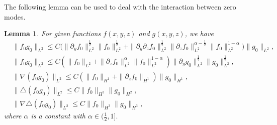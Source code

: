 \documentclass[12pt, reqno]{amsart}
\newtheorem{lemma}{Lemma}[section]
\numberwithin{equation}{section}
\begin{document}
	The following lemma can be used to deal with the interaction between zero modes.
	\begin{lemma}\label{sob_12}
		For  given functions $f(x,y,z)$ and $g(x,y,z)$, we have
		\begin{equation}\label{sob_result_4}
			\begin{aligned}
				&\|f_{0}g_{0}\|_{L^{2}}
				\leq C\big(\|\partial_yf_{0}\|^{\frac{1}{2}}_{L^2}\|f_{0}\|^{\frac{1}{2}}_{L^2}+\|\partial_y\partial_zf_{0}\|^{\frac{1}{2}}_{L^2}
				\|\partial_zf_{0}\|^{\alpha-\frac{1}{2}}_{L^2}
				\|f_{0}\|^{1-\alpha}_{L^2}\big)\|g_{0}\|_{L^{2}},\\
				&\|f_{0}g_{0}\|_{L^{2}}
				\leq C\left(\|f_{0}\|_{L^2}+\|\partial_zf_{0}\|_{L^2}^{\alpha}\|f_0\|_{L^2}^{1-\alpha}\right)\|\partial_yg_{0}\|_{L^2}^{\frac{1}{2}}
				\|g_{0}\|_{L^2}^{\frac{1}{2}},\\
				&\|\nabla(f_{0}g_{0})\|_{L^{2}}
				\leq C(\|f_{0}\|_{H^1}+\|\partial_zf_{0}\|_{H^1})\|g_{0}\|_{H^{1}},\\
				&\|\triangle(f_{0}g_{0})\|_{L^{2}}
				\leq C\|f_{0}\|_{H^2}\|g_{0}\|_{H^{2}},\\
				&\|\nabla\triangle(f_{0}g_{0})\|_{L^{2}}
				\leq C\|f_{0}\|_{H^3}\|g_{0}\|_{H^{3}},
			\end{aligned}
		\end{equation}	
		where $ \alpha $ is a constant with $\alpha\in(\frac12,1].$
	\end{lemma}
\end{document}
